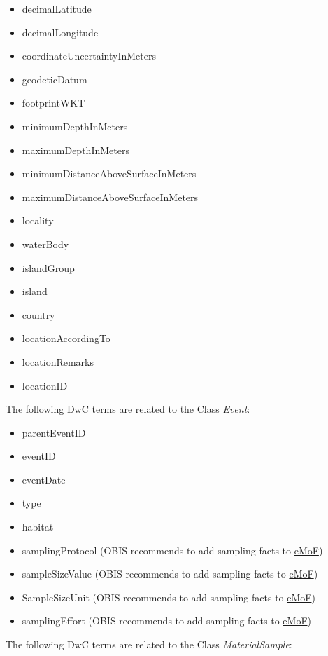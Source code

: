 \documentclass[
  letterpaper,
  DIV=11,
  numbers=noendperiod,
  oneside]{scrreprt}
\providecommand{\tightlist}{%
  \setlength{\itemsep}{0pt}\setlength{\parskip}{0pt}}\usepackage{longtable,booktabs,array}
\begin{document}
\begin{itemize}
\tightlist
\item
  decimalLatitude
\item
  decimalLongitude
\item
  coordinateUncertaintyInMeters
\item
  geodeticDatum
\item
  footprintWKT
\item
  minimumDepthInMeters
\item
  maximumDepthInMeters
\item
  minimumDistanceAboveSurfaceInMeters
\item
  maximumDistanceAboveSurfaceInMeters
\item
  locality
\item
  waterBody
\item
  islandGroup
\item
  island
\item
  country
\item
  locationAccordingTo
\item
  locationRemarks
\item
  locationID
\end{itemize}

The following DwC terms are related to the Class \emph{Event}:

\begin{itemize}
\tightlist
\item
  parentEventID
\item
  eventID
\item
  eventDate
\item
  type
\item
  habitat
\item
  samplingProtocol (OBIS recommends to add sampling facts to
  \protect\hyperlink{extendedmeasurementorfact-extension-emof}{eMoF})
\item
  sampleSizeValue (OBIS recommends to add sampling facts to
  \protect\hyperlink{extendedmeasurementorfact-extension-emof}{eMoF})
\item
  SampleSizeUnit (OBIS recommends to add sampling facts to
  \protect\hyperlink{extendedmeasurementorfact-extension-emof}{eMoF})
\item
  samplingEffort (OBIS recommends to add sampling facts to
  \protect\hyperlink{extendedmeasurementorfact-extension-emof}{eMoF})
\end{itemize}

The following DwC terms are related to the Class \emph{MaterialSample}:
\end{document}
